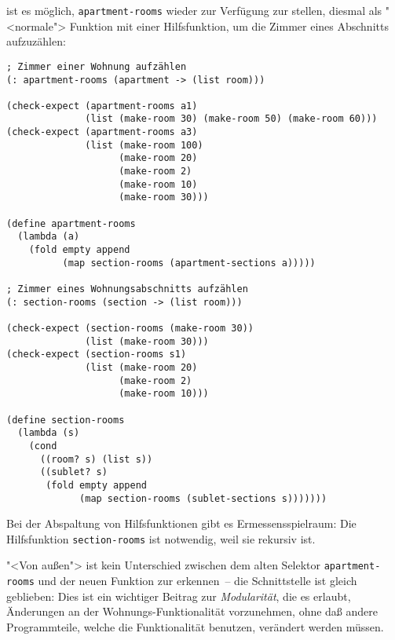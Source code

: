 ist es möglich, \texttt{apartment-rooms} wieder zur Verfügung zur
stellen, diesmal als "<normale"> Funktion mit einer Hilfsfunktion, um
die Zimmer eines Abschnitts aufzuzählen:
%
\begin{verbatim}
; Zimmer einer Wohnung aufzählen
(: apartment-rooms (apartment -> (list room)))

(check-expect (apartment-rooms a1)
              (list (make-room 30) (make-room 50) (make-room 60)))
(check-expect (apartment-rooms a3)
              (list (make-room 100)
                    (make-room 20)
                    (make-room 2)
                    (make-room 10)
                    (make-room 30)))

(define apartment-rooms
  (lambda (a)
    (fold empty append
          (map section-rooms (apartment-sections a)))))

; Zimmer eines Wohnungsabschnitts aufzählen
(: section-rooms (section -> (list room)))

(check-expect (section-rooms (make-room 30))
              (list (make-room 30)))
(check-expect (section-rooms s1)
              (list (make-room 20)
                    (make-room 2)
                    (make-room 10)))
              
(define section-rooms
  (lambda (s)
    (cond
      ((room? s) (list s))
      ((sublet? s)
       (fold empty append
             (map section-rooms (sublet-sections s)))))))
\end{verbatim}
%
Bei der Abspaltung von Hilfsfunktionen gibt es Ermessensspielraum:
Die Hilfsfunktion \texttt{section-rooms} ist notwendig, weil sie
rekursiv ist.

"<Von außen"> ist kein Unterschied zwischen dem alten Selektor
\texttt{apartment-rooms} und der neuen Funktion zur erkennen~-- die
Schnittstelle ist gleich geblieben: Dies ist ein wichtiger Beitrag zur
\textit{Modularität}, die es erlaubt, Änderungen an
der Wohnungs-Funktionalität vorzunehmen, ohne daß andere
Programmteile, welche die Funktionalität benutzen, verändert werden
müssen.

